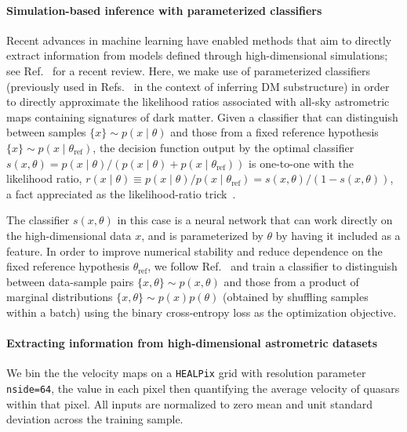 \documentclass[preprint]{article}
\begin{document}
\paragraph{Simulation-based inference with parameterized classifiers} Recent advances in machine learning have enabled methods that aim to directly extract information from models defined through high-dimensional simulations; see Ref.~\cite{Cranmer:2019eaq} for a recent review. Here, we make use of parameterized classifiers~\cite{Cranmer:2015bka,Baldi:2016fzo,Brehmer:2018eca,Brehmer:2018hga,Brehmer:2018kdj,Hermans:2019ioj} (previously used in Refs.~\cite{Brehmer:2019jyt,Hermans:2020skz} in the context of inferring DM substructure) in order to directly approximate the likelihood ratios associated with all-sky astrometric maps containing signatures of dark matter. Given a classifier that can distinguish between samples $\{x\} \sim p(x\mid\theta)$ and those from a fixed reference hypothesis $\{x\} \sim p(x\mid\theta_\mathrm{ref})$, the decision function output by the optimal classifier $s(x, \theta) = {p(x\mid\theta)}/{\left(p(x\mid\theta) + p(x\mid\theta_\mathrm{ref})\right)}$ is one-to-one with the likelihood ratio, $r(x\mid \theta) \equiv {p(x\mid\theta)}/{p(x\mid\theta_\mathrm{ref})}  = {s(x, \theta)}/{\left(1 - s(x, \theta)\right)}$, a fact appreciated as the likelihood-ratio trick~\cite{Cranmer:2015bka,mohamed2017learning}. 

The classifier $s(x, \theta)$ in this case is a neural network that can work directly on the high-dimensional data $x$, and is parameterized by $\theta$ by having it included as a feature. In order to improve numerical stability and reduce dependence on the fixed reference hypothesis $\theta_\mathrm{ref}$, we follow Ref.~\cite{Hermans:2019ioj} and train a classifier to distinguish between data-sample pairs $\{x, \theta\} \sim p(x,\theta)$ and those from a product of marginal distributions $\{x, \theta\} \sim p(x)p(\theta)$ (obtained by shuffling samples within a batch) using the binary cross-entropy loss as the optimization objective. 

\paragraph{Extracting information from high-dimensional astrometric datasets} We bin the the velocity maps on a \texttt{HEALPix} grid with resolution parameter \texttt{nside=64}, the value in each pixel then quantifying the average velocity of quasars within that pixel. All inputs are normalized to zero mean and unit standard deviation across the training sample. 
\end{document}
